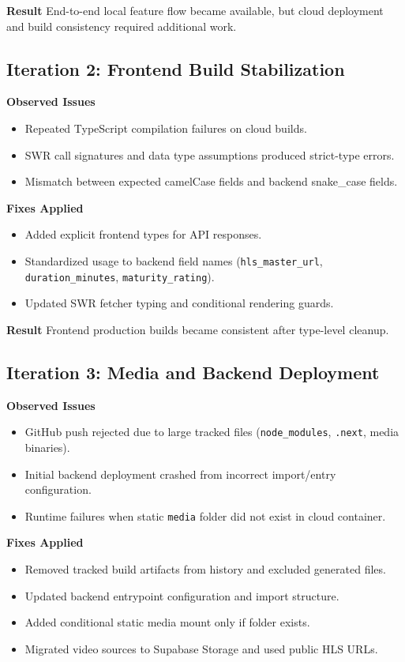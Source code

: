 \documentclass[conference]{IEEEtran}
\begin{document}
\textbf{Result}
End-to-end local feature flow became available, but cloud deployment and build consistency required additional work.

\subsection{Iteration 2: Frontend Build Stabilization}
\textbf{Observed Issues}
\begin{itemize}
\item Repeated TypeScript compilation failures on cloud builds.
\item SWR call signatures and data type assumptions produced strict-type errors.
\item Mismatch between expected camelCase fields and backend snake\_case fields.
\end{itemize}

\textbf{Fixes Applied}
\begin{itemize}
\item Added explicit frontend types for API responses.
\item Standardized usage to backend field names (\texttt{hls\_master\_url}, \texttt{duration\_minutes}, \texttt{maturity\_rating}).
\item Updated SWR fetcher typing and conditional rendering guards.
\end{itemize}

\textbf{Result}
Frontend production builds became consistent after type-level cleanup.

\subsection{Iteration 3: Media and Backend Deployment}
\textbf{Observed Issues}
\begin{itemize}
\item GitHub push rejected due to large tracked files (\texttt{node\_modules}, \texttt{.next}, media binaries).
\item Initial backend deployment crashed from incorrect import/entry configuration.
\item Runtime failures when static \texttt{media} folder did not exist in cloud container.
\end{itemize}

\textbf{Fixes Applied}
\begin{itemize}
\item Removed tracked build artifacts from history and excluded generated files.
\item Updated backend entrypoint configuration and import structure.
\item Added conditional static media mount only if folder exists.
\item Migrated video sources to Supabase Storage and used public HLS URLs.
\end{itemize}
\end{document}
